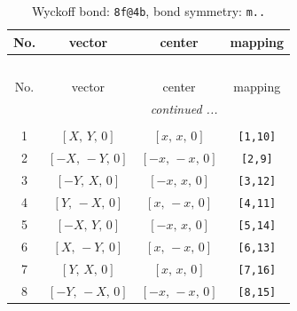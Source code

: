 \documentclass[fleqn,8pt]{jsarticle}
\begin{document}
\begin{longtable}{cccc}
\caption{Wyckoff bond: {\tt 8f@4b}, bond symmetry: {\tt m..}}
 \\
 \hline \hline
No. & vector & center & mapping \\ \hline \endfirsthead

\multicolumn{3}{l}{\tablename\ \thetable{}} \\
 \hline \hline
No. & vector & center & mapping \\ \hline \endhead

 \hline \hline
\multicolumn{3}{r}{\footnotesize\it continued ...} \\ \endfoot

 \hline \hline
\multicolumn{3}{r}{} \\ \endlastfoot

1 & $\left[ X,\, Y,\, 0 \right]$ & $\left[ x,\, x,\, 0 \right]$ & {\tt [1,10]} \\ \hline
2 & $\left[ - X,\, - Y,\, 0 \right]$ & $\left[ - x,\, - x,\, 0 \right]$ & {\tt [2,9]} \\ \hline
3 & $\left[ - Y,\, X,\, 0 \right]$ & $\left[ - x,\, x,\, 0 \right]$ & {\tt [3,12]} \\ \hline
4 & $\left[ Y,\, - X,\, 0 \right]$ & $\left[ x,\, - x,\, 0 \right]$ & {\tt [4,11]} \\ \hline
5 & $\left[ - X,\, Y,\, 0 \right]$ & $\left[ - x,\, x,\, 0 \right]$ & {\tt [5,14]} \\ \hline
6 & $\left[ X,\, - Y,\, 0 \right]$ & $\left[ x,\, - x,\, 0 \right]$ & {\tt [6,13]} \\ \hline
7 & $\left[ Y,\, X,\, 0 \right]$ & $\left[ x,\, x,\, 0 \right]$ & {\tt [7,16]} \\ \hline
8 & $\left[ - Y,\, - X,\, 0 \right]$ & $\left[ - x,\, - x,\, 0 \right]$ & {\tt [8,15]} \\
\end{longtable}
\renewcommand{\arraystretch}{1.2}
\end{document}
